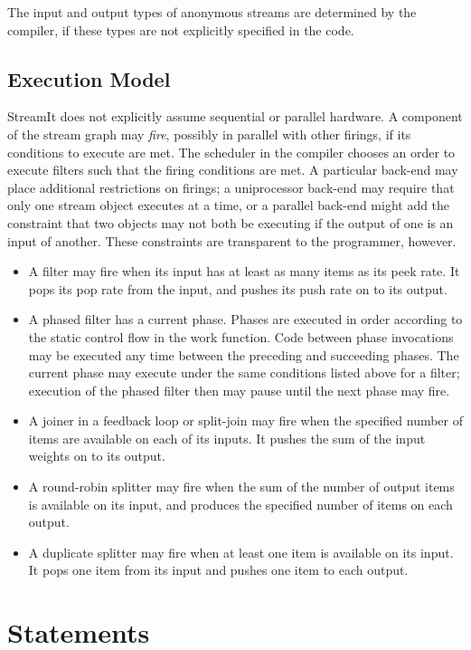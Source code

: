 \documentclass[11pt]{article}
\begin{document}
The input and output types of anonymous streams are determined by the
compiler, if these types are not explicitly specified in the code.

\subsection{Execution Model}

StreamIt does not explicitly assume sequential or parallel hardware.
A component of the stream graph may \emph{fire}, possibly in parallel
with other firings, if its conditions to execute are met.  The
scheduler in the compiler chooses an order to execute filters such
that the firing conditions are met.  A particular back-end may place
additional restrictions on firings; a uniprocessor back-end may
require that only one stream object executes at a time, or a parallel
back-end might add the constraint that two objects may not both be
executing if the output of one is an input of another.  These
constraints are transparent to the programmer, however.

\begin{itemize}
\item A filter may fire when its input has at least as many items as
  its peek rate.  It pops its pop rate from the input, and pushes its
  push rate on to its output.
\item A phased filter has a current phase.  Phases are executed in
  order according to the static control flow in the work function.
  Code between phase invocations may be executed any time between the
  preceding and succeeding phases.  The current phase may execute
  under the same conditions listed above for a filter; execution of
  the phased filter then may pause until the next phase may fire.
\item A joiner in a feedback loop or split-join may fire when the
  specified number of items are available on each of its inputs.  It
  pushes the sum of the input weights on to its output.
\item A round-robin splitter may fire when the sum of the number of
  output items is available on its input, and produces the specified
  number of items on each output.
\item A duplicate splitter may fire when at least one item is
  available on its input.  It pops one item from its input and pushes
  one item to each output.
\end{itemize}

\section{Statements}
\end{document}
